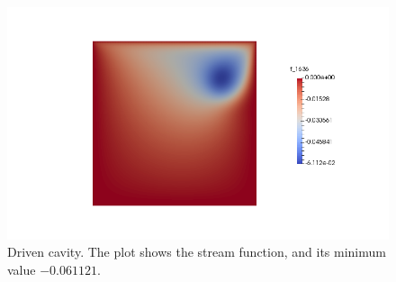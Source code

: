 \documentclass[a4paper,11pt,openright,twoside]{book}
\begin{document}
\vspace{-.3cm}
\begin{figure}[h!]
\centering
\includegraphics[width=\textwidth]{images/mine.png}
\vspace{-1cm}
\caption{Driven cavity. The plot shows the stream function, and its minimum value $-0.061 121$.}
\end{figure}
\end{document}
